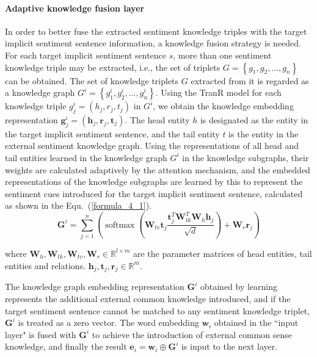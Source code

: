 \paragraph{Adaptive knowledge fusion layer}

In order to better fuse the extracted sentiment knowledge triples with the target implicit sentiment sentence information, a knowledge fusion strategy is needed. For each target implicit sentiment sentence $s$, more than one sentiment knowledge triple may be extracted, i.e., the set of triplets $G=\left\{g_{1}, g_{2}, \ldots, g_{n}\right\}$ can be obtained.
The set of knowledge triplets $G$ extracted from it is regarded as a knowledge graph $G^{i}=\left\{g_{1}^{i}, g_{2}^{i}, \ldots, g_{n}^{i}\right\}$. Using the TranR model \cite{lin2015learning} for each knowledge triple $ g_{j}^{i}=\left(h_{j}, r_{j}, t_{j}\right)$ in $G^{i}$, we obtain the knowledge embedding representation $\boldsymbol{g}_{j}^{i}=\left(\boldsymbol{h}_{j}, \boldsymbol{r}_{j}, \boldsymbol{t}_{j}\right)$. The head entity $h$ is designated as the entity in the target implicit sentiment sentence, and the tail entity $t$ is the entity in the external sentiment knowledge graph.
Using the representations of all head and tail entities learned in the knowledge graph $G^{i}$ in the knowledge subgraphs, their weights are calculated adaptively by the attention mechanism, and the embedded representations of the knowledge subgraphs are learned by this to represent the sentiment cues introduced for the target implicit sentiment sentence, calculated as shown in the Equ.~(\ref{formula_4_1}).
\begin{equation}
    \boldsymbol{G}^{i}=\sum_{j=1}^{n} (\operatorname{softmax}(\boldsymbol{W}_{tv} \boldsymbol{t}_{j}\frac{\boldsymbol{t}_{j}^{T}\boldsymbol{W}_{tk}^{T}\boldsymbol{W}_{h} \boldsymbol{h}_{j}}{\sqrt{d}})+\boldsymbol{W}_{r} \boldsymbol{r}_{j})\label{formula_4_1}
\end{equation}

where $\boldsymbol{W}_{h}, \boldsymbol{W}_{tk},\boldsymbol{W}_{tv}, \boldsymbol{W}_{r} \in \mathbb{R}^{l \times m}$ are the parameter matrices of head entities, tail entities and relations. $\boldsymbol{h}_j, \boldsymbol{t}_j, \boldsymbol{r}_j \in \mathbb{R}^m$.

The knowledge graph embedding representation $\boldsymbol{G}^i$ obtained by learning represents the additional external common knowledge introduced, and if the target sentiment sentence cannot be matched to any sentiment knowledge triplet, $\boldsymbol{G}^i$ is treated as a zero vector.
The word embedding $\boldsymbol{w}_{i}$ obtained in the ``input layer" is fused with $\boldsymbol{G}^i$ to achieve the introduction of external common sense knowledge, and finally the result $\boldsymbol{e}_i=\boldsymbol{ w}_i \oplus \boldsymbol{G}^i$ is input to the next layer.

